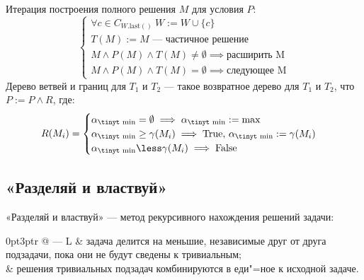 Итерация построения полного решения $M$ для условия $P$:
$$\begin{cases}
\forall c\in C_{W.\text{last}()}\ W:=W\cup\{c\}\\
T(M):=M\text{ --- частичное решение}\\
M\land P(M)\land T(M)\neq\emptyset\implies\text{расширить M}\\
M\land P(M)\land T(M)=\emptyset\implies\text{следующее M}
\end{cases}$$
{\ital Дерево ветвей и границ} для $T_1$ и $T_2$ --- такое возвратное дерево для $T_1$ и $T_2$, что $P:=P\land R$, где:
$$R(M_i)=\begin{cases}
\alpha_{\text{\tinyt min}}=\emptyset\implies\alpha_{\text{\tinyt min}}:=\text{max}\\
\alpha_\text{\tinyt min}\geq\gamma(M_i)\implies\text{True, }\alpha_\text{\tinyt min}:=\gamma(M_i)\\
\alpha_\text{\tinyt min}\less\gamma(M_i)\implies\text{False}\\
\end{cases}$$

\subsection{«Разделяй и властвуй»}

{\bold «Разделяй и властвуй»} --- метод рекурсивного нахождения решений задачи: 
\begin{tabularcx}{0pt}{3pt}{r @{ --- } L}{\textwidth}
& задача делится на меньшие, {\ital независимые} друг от друга подзадачи, пока они не будут сведены к {\ital тривиальным};\\
& решения тривиальных подзадач {\ital комбинируются} в еди"=ное к исходной задаче.
\end{tabularcx}

